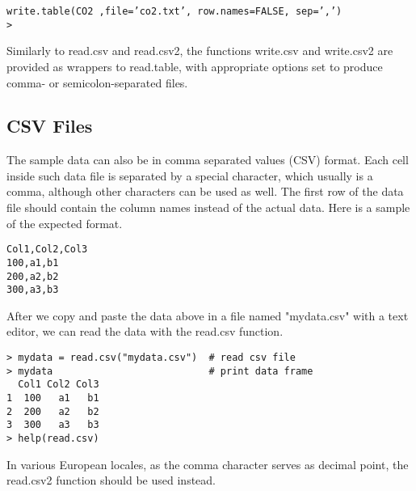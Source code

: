\begin{framed}
\begin{verbatim}
write.table(CO2 ,file=’co2.txt’, row.names=FALSE, sep=’,’)
>
\end{verbatim}
\end{framed}

Similarly to read.csv and read.csv2, the functions write.csv and write.csv2 are provided as wrappers to read.table, with appropriate options set to produce comma- or semicolon-separated files. 

\subsection{CSV Files}
The sample data can also be in comma separated values (CSV) format. Each cell inside such data file is separated by a special character, which usually is a comma, although other characters can be used as well.
The first row of the data file should contain the column names instead of the actual data. Here is a sample of the expected format.

\begin{framed}
\begin{verbatim}Col1,Col2,Col3 
100,a1,b1 
200,a2,b2 
300,a3,b3 
\end{verbatim}
\end{framed}

After we copy and paste the data above in a file named "mydata.csv" with a text editor, we can read the data with the read.csv function.
\begin{framed}
\begin{verbatim}
> mydata = read.csv("mydata.csv")  # read csv file 
> mydata                           # print data frame 
  Col1 Col2 Col3 
1  100   a1   b1 
2  200   a2   b2 
3  300   a3   b3 
> help(read.csv)
\end{verbatim}
\end{framed}
In various European locales, as the comma character serves as decimal point, the read.csv2 function should be used instead.



